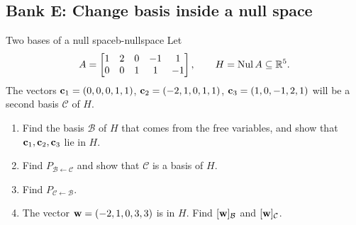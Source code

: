 \documentclass[11pt]{article}
\begin{document}
\subsection*{Bank E: Change basis inside a null space}
\begin{exmp}{Two bases of a null space}{b-nullspace}
Let
\[
A=\begin{bmatrix}1&2&0&-1&1\\0&0&1&1&-1\end{bmatrix},\qquad H=\operatorname{Nul} A\subseteq\mathbb{R}^5.
\]
The vectors $\mathbf{c}_1=(0,0,0,1,1)$, $\mathbf{c}_2=(-2,1,0,1,1)$, $\mathbf{c}_3=(1,0,-1,2,1)$ will be a second basis $\mathcal{C}$ of $H$.
\begin{enumerate}
  \item[(a)] Find the basis $\mathcal{B}$ of $H$ that comes from the free variables, and show that $\mathbf{c}_1,\mathbf{c}_2,\mathbf{c}_3$ lie in $H$.
  \item[(b)] Find $P_{\mathcal{B}\leftarrow\mathcal{C}}$ and show that $\mathcal{C}$ is a basis of $H$.
  \item[(c)] Find $P_{\mathcal{C}\leftarrow\mathcal{B}}$.
  \item[(d)] The vector $\mathbf{w}=(-2,1,0,3,3)$ is in $H$. Find $[\mathbf{w}]_{\mathcal{B}}$ and $[\mathbf{w}]_{\mathcal{C}}$.
\end{enumerate}


\end{exmp}
\end{document}
